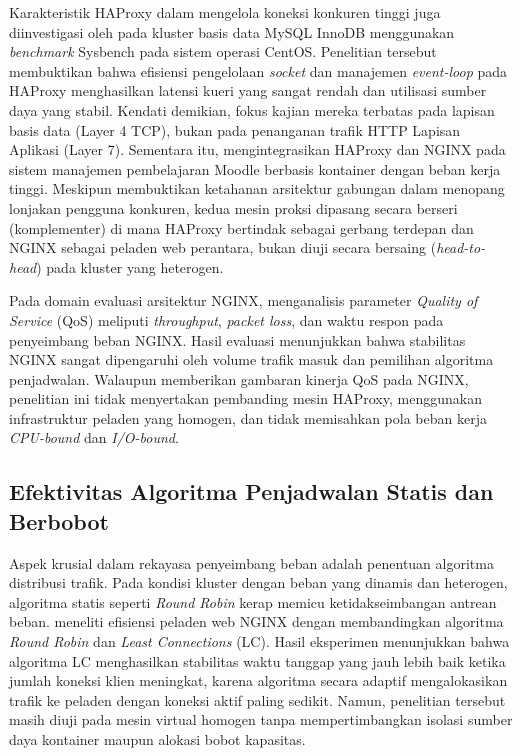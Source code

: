 Karakteristik HAProxy dalam mengelola koneksi konkuren tinggi juga diinvestigasi oleh \citet{arini2025perbandingan} pada kluster basis data MySQL InnoDB menggunakan \textit{benchmark} Sysbench pada sistem operasi CentOS. Penelitian tersebut membuktikan bahwa efisiensi pengelolaan \textit{socket} dan manajemen \textit{event-loop} pada HAProxy menghasilkan latensi kueri yang sangat rendah dan utilisasi sumber daya yang stabil. Kendati demikian, fokus kajian mereka terbatas pada lapisan basis data (Layer 4 TCP), bukan pada penanganan trafik HTTP Lapisan Aplikasi (Layer 7). Sementara itu, \citet{mihai2023integrated} mengintegrasikan HAProxy dan NGINX pada sistem manajemen pembelajaran Moodle berbasis kontainer dengan beban kerja tinggi. Meskipun membuktikan ketahanan arsitektur gabungan dalam menopang lonjakan pengguna konkuren, kedua mesin proksi dipasang secara berseri (komplementer) di mana HAProxy bertindak sebagai gerbang terdepan dan NGINX sebagai peladen web perantara, bukan diuji secara bersaing (\textit{head-to-head}) pada kluster yang heterogen.

Pada domain evaluasi arsitektur NGINX, \citet{ikramsyah2025evaluating} menganalisis parameter \textit{Quality of Service} (QoS) meliputi \textit{throughput}, \textit{packet loss}, dan waktu respon pada penyeimbang beban NGINX. Hasil evaluasi menunjukkan bahwa stabilitas NGINX sangat dipengaruhi oleh volume trafik masuk dan pemilihan algoritma penjadwalan. Walaupun memberikan gambaran kinerja QoS pada NGINX, penelitian ini tidak menyertakan pembanding mesin HAProxy, menggunakan infrastruktur peladen yang homogen, dan tidak memisahkan pola beban kerja \textit{CPU-bound} dan \textit{I/O-bound}.

\subsection{Efektivitas Algoritma Penjadwalan Statis dan Berbobot}
Aspek krusial dalam rekayasa penyeimbang beban adalah penentuan algoritma distribusi trafik. Pada kondisi kluster dengan beban yang dinamis dan heterogen, algoritma statis seperti \textit{Round Robin} kerap memicu ketidakseimbangan antrean beban. \citet{zahir2025analisis} meneliti efisiensi peladen web NGINX dengan membandingkan algoritma \textit{Round Robin} dan \textit{Least Connections} (LC). Hasil eksperimen menunjukkan bahwa algoritma LC menghasilkan stabilitas waktu tanggap yang jauh lebih baik ketika jumlah koneksi klien meningkat, karena algoritma secara adaptif mengalokasikan trafik ke peladen dengan koneksi aktif paling sedikit. Namun, penelitian tersebut masih diuji pada mesin virtual homogen tanpa mempertimbangkan isolasi sumber daya kontainer maupun alokasi bobot kapasitas.

